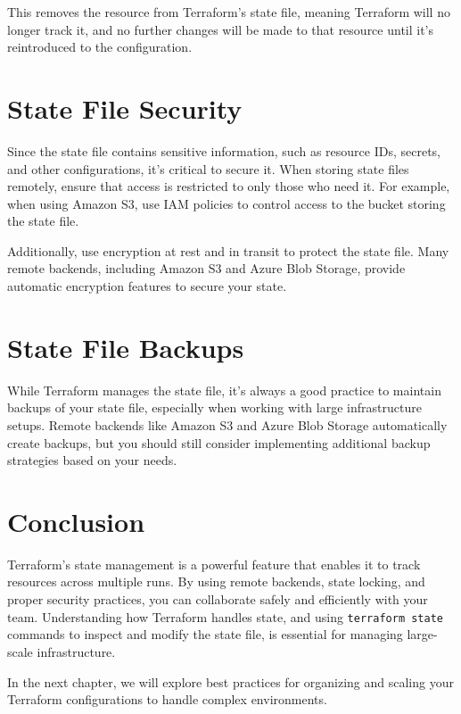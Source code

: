 This removes the resource from Terraform's state file, meaning Terraform will no longer track it, and no further changes will be made to that resource until it's reintroduced to the configuration.

\section{State File Security}

Since the state file contains sensitive information, such as resource IDs, secrets, and other configurations, it's critical to secure it. When storing state files remotely, ensure that access is restricted to only those who need it. For example, when using Amazon S3, use IAM policies to control access to the bucket storing the state file.

Additionally, use encryption at rest and in transit to protect the state file. Many remote backends, including Amazon S3 and Azure Blob Storage, provide automatic encryption features to secure your state.

\section{State File Backups}

While Terraform manages the state file, it's always a good practice to maintain backups of your state file, especially when working with large infrastructure setups. Remote backends like Amazon S3 and Azure Blob Storage automatically create backups, but you should still consider implementing additional backup strategies based on your needs.

\section{Conclusion}

Terraform's state management is a powerful feature that enables it to track resources across multiple runs. By using remote backends, state locking, and proper security practices, you can collaborate safely and efficiently with your team. Understanding how Terraform handles state, and using \texttt{terraform state} commands to inspect and modify the state file, is essential for managing large-scale infrastructure.

In the next chapter, we will explore best practices for organizing and scaling your Terraform configurations to handle complex environments.
